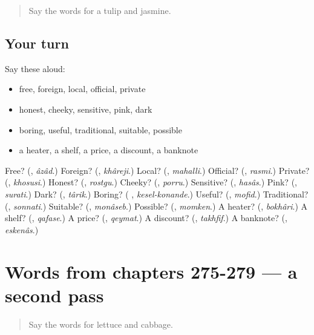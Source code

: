 \begin{quote}
Say the words for a tulip and jasmine.
\end{quote}

\subsection*{Your turn}
Say these aloud:

\begin{itemize}
\raggedright
  \item free, foreign, local, official, private
  \item honest, cheeky, sensitive, pink, dark
  \item boring, useful, traditional, suitable, possible
  \item a heater, a shelf, a price, a discount, a banknote
\end{itemize}

\begin{tcolorbox}[breakable,colback=teal!4,colframe=teal!35!black,title={Before you move on}]
Free? (\textbf{}, \emph{âzâd}.) Foreign? (\textbf{}, \emph{khâreji}.) Local? (\textbf{}, \emph{mahalli}.) Official? (\textbf{}, \emph{rasmi}.) Private? (\textbf{}, \emph{khosusi}.) Honest? (\textbf{}, \emph{rostgu}.) Cheeky? (\textbf{}, \emph{porru}.) Sensitive? (\textbf{}, \emph{hasâs}.) Pink? (\textbf{}, \emph{surati}.) Dark? (\textbf{}, \emph{târik}.) Boring? (\textbf{ }, \emph{kesel-konande}.) Useful? (\textbf{}, \emph{mofid}.) Traditional? (\textbf{}, \emph{sonnati}.) Suitable? (\textbf{}, \emph{monâseb}.) Possible? (\textbf{}, \emph{momken}.) A heater? (\textbf{}, \emph{bokhâri}.) A shelf? (\textbf{}, \emph{qafase}.) A price? (\textbf{}, \emph{qeymat}.) A discount? (\textbf{}, \emph{takhfif}.) A banknote? (\textbf{}, \emph{eskenâs}.)
\end{tcolorbox}
\section[(dialogue)]{Words from chapters 275-279 — a second pass}

\label{lesson:FA-R279-second-pass-words-from-chapters-275-279}



\begin{quote}
Say the words for lettuce and cabbage.
\end{quote}

